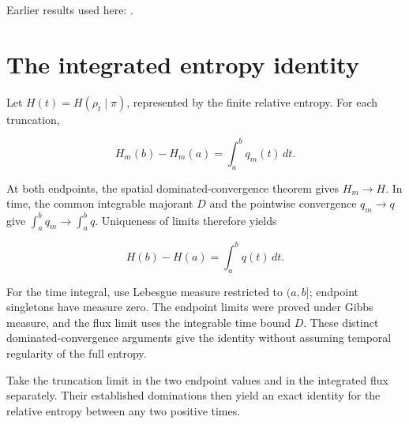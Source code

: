 \documentclass[11pt,a4paper]{article}
\begin{document}
Earlier results used here: \cite[Section~3.26.3]{LangevinLean2026ULASC}.

\section{\texorpdfstring{The integrated entropy identity}{The integrated entropy identity}}


Let \(H(t)=H(\rho_t\mid\pi)\), represented by the finite relative entropy. For each truncation,

\[H_m(b)-H_m(a)=\int_a^b q_m(t)\,dt.\]

At both endpoints, the spatial dominated-convergence theorem gives \(H_m\to H\). In time, the common integrable majorant \(D\) and the pointwise convergence \(q_m\to q\) give \(\int_a^b q_m\to\int_a^b q\). Uniqueness of limits therefore yields

\[H(b)-H(a)=\int_a^b q(t)\,dt.\]

For the time integral, use Lebesgue measure restricted to \((a,b]\); endpoint singletons have measure zero. The endpoint limits were proved under Gibbs measure, and the flux limit uses the integrable time bound \(D\). These distinct dominated-convergence arguments give the identity without assuming temporal regularity of the full entropy.



Take the truncation limit in the two endpoint values and in the integrated flux separately. Their established dominations then yield an exact identity for the relative entropy between any two positive times.
\end{document}
